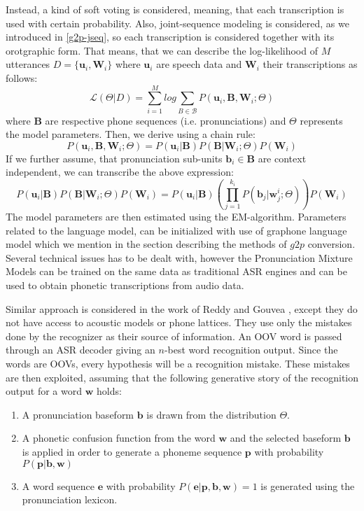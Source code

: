 Instead, a kind of soft voting is considered, meaning, that each transcription is used with certain probability.
Also, joint-sequence modeling is considered, as we introduced in \ref{g2p-jseq}, so each transcription is considered together with its orotgraphic form.
That means, that we can describe the log-likelihood of $M$ utterances $ D = \{\mathbf{u}_i,\mathbf{W}_i\}$ where $\mathbf{u}_i$ are speech data and $\mathbf{W}_i$ their transcriptions as follows:
\begin{equation}
\mathcal{L}(\Theta\vert D) = \sum_{i=1}^M log \sum_{B \in \mathcal{B}} P(\mathbf{u}_i,\mathbf{B},\mathbf{W}_i;\Theta)
\end{equation}
where $\mathbf{B}$ are respective phone sequences (i.e. pronunciations) and $\Theta$ represents the model parameters.
Then, we derive using a chain rule:
\begin{equation}
P(\mathbf{u}_i,\mathbf{B},\mathbf{W}_i;\Theta) =  P(\mathbf{u}_i\vert\mathbf{B})P(\mathbf{B}\vert\mathbf{W}_i;\Theta)P(\mathbf{W}_i)
\end{equation}
If we further assume, that pronunciation sub-units $\mathbf{b}_i \in \mathbf{B}$ are context independent, we can transcribe the above expression:
\begin{equation}
P(\mathbf{u}_i\vert\mathbf{B})P(\mathbf{B}\vert\mathbf{W}_i;\Theta)P(\mathbf{W}_i) = P(\mathbf{u}_i\vert\mathbf{B})(\prod_{j=1}^{k_i}P(\mathbf{b}_j\vert \mathbf{w}^i_j;\Theta))P(\mathbf{W}_i) 
\end{equation}
The model parameters are then estimated using the EM-algorithm.
Parameters related to the language model, can be initialized with use of graphone language model which we mention in the section describing the methods of $g2p$ conversion.
Several technical issues has to be dealt with, however the Pronunciation Mixture Models can be trained on the same data as traditional ASR engines and can be used to obtain phonetic transcriptions from audio data.
\par
Similar approach is considered in the work of Reddy and Gouvea \cite{reddy2011learning}, except they do not have access to acoustic models or phone lattices.
They use only the mistakes done by the recognizer as their source of information.
An OOV word is passed through an ASR decoder giving an $n$-best word recognition output.
Since the words are OOVs, every hypothesis will be a recognition mistake.
These mistakes are then exploited, assuming that the following generative story of the recognition output
for a word $\mathbf{w}$ holds:
\begin{enumerate}
\item A pronunciation baseform $\mathbf{b}$ is drawn from the distribution $\Theta$.
\item A phonetic confusion function from the word $\mathbf{w}$ and the selected baseform $\mathbf{b}$ is applied in order to generate a phoneme sequence $\mathbf{p}$ with probability $P(\mathbf{p}|\mathbf{b},\mathbf{w})$
\item A word sequence $\mathbf{e}$ with probability $P (\mathbf{e} \vert \mathbf{p},\mathbf{b},\mathbf{w}) = 1$ 
is generated using the pronunciation lexicon.
\end{enumerate}
